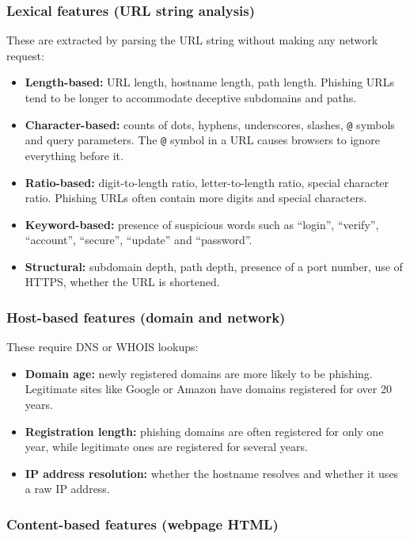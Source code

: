\documentclass[11pt,a4paper]{article}
\begin{document}
\subsubsection*{Lexical features (URL string analysis)}

These are extracted by parsing the URL string without making any network request:
\begin{itemize}
  \item \textbf{Length-based:} URL length, hostname length, path length. Phishing URLs tend to be longer to accommodate deceptive subdomains and paths.
  \item \textbf{Character-based:} counts of dots, hyphens, underscores, slashes, \texttt{@} symbols and query parameters. The \texttt{@} symbol in a URL causes browsers to ignore everything before it.
  \item \textbf{Ratio-based:} digit-to-length ratio, letter-to-length ratio, special character ratio. Phishing URLs often contain more digits and special characters.
  \item \textbf{Keyword-based:} presence of suspicious words such as ``login'', ``verify'', ``account'', ``secure'', ``update'' and ``password''.
  \item \textbf{Structural:} subdomain depth, path depth, presence of a port number, use of HTTPS, whether the URL is shortened.
\end{itemize}

\subsubsection*{Host-based features (domain and network)}

These require DNS or WHOIS lookups:
\begin{itemize}
  \item \textbf{Domain age:} newly registered domains are more likely to be phishing. Legitimate sites like Google or Amazon have domains registered for over 20 years.
  \item \textbf{Registration length:} phishing domains are often registered for only one year, while legitimate ones are registered for several years.
  \item \textbf{IP address resolution:} whether the hostname resolves and whether it uses a raw IP address.
\end{itemize}

\subsubsection*{Content-based features (webpage HTML)}
\end{document}
